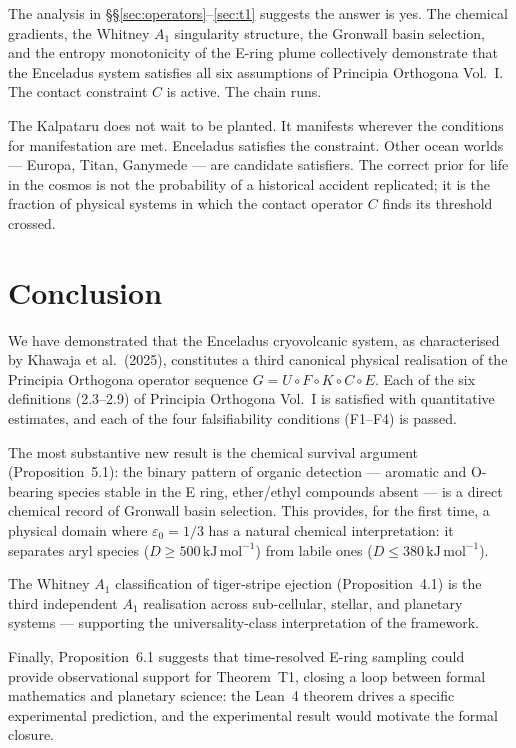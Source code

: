 \documentclass[12pt]{article}
\numberwithin{equation}{section}
\theoremstyle{remark}
\begin{document}
The analysis in \S\S\ref{sec:operators}--\ref{sec:t1} suggests the answer is yes.
The chemical gradients, the Whitney $A_1$ singularity structure, the Gronwall basin
selection, and the entropy monotonicity of the E-ring plume collectively demonstrate
that the Enceladus system satisfies all six assumptions of Principia Orthogona
Vol.~I. The contact constraint $C$ is active. The chain runs.

The Kalpataru does not wait to be planted. It manifests wherever the conditions
for manifestation are met. Enceladus satisfies the constraint.
Other ocean worlds --- Europa, Titan, Ganymede --- are candidate satisfiers.
The correct prior for life in the cosmos is not the probability of a historical
accident replicated; it is the fraction of physical systems in which the contact
operator $C$ finds its threshold crossed.

\section{Conclusion}

We have demonstrated that the Enceladus cryovolcanic system, as characterised
by Khawaja et al.\ (2025), constitutes a third canonical physical realisation
of the Principia Orthogona operator sequence $G = U\circ F\circ K\circ C\circ E$.
Each of the six definitions (2.3--2.9) of Principia Orthogona Vol.~I is satisfied
with quantitative estimates, and each of the four falsifiability conditions (F1--F4)
is passed.

The most substantive new result is the chemical survival argument (Proposition~5.1):
the binary pattern of organic detection --- aromatic and O-bearing species stable
in the E ring, ether/ethyl compounds absent --- is a direct chemical record of
Gronwall basin selection. This provides, for the first time, a physical domain where
$\varepsilon_0 = 1/3$ has a natural chemical interpretation: it separates aryl
species ($D\geq 500\,\mathrm{kJ\,mol}^{-1}$) from labile ones
($D\leq 380\,\mathrm{kJ\,mol}^{-1}$).

The Whitney $A_1$ classification of tiger-stripe ejection (Proposition~4.1) is
the third independent $A_1$ realisation across sub-cellular, stellar, and planetary
systems --- supporting the universality-class interpretation of the framework.

Finally, Proposition~6.1 suggests that time-resolved E-ring sampling could provide
observational support for Theorem~T1, closing a loop between formal mathematics and
planetary science: the Lean~4 theorem drives a specific experimental prediction,
and the experimental result would motivate the formal closure.
\end{document}
